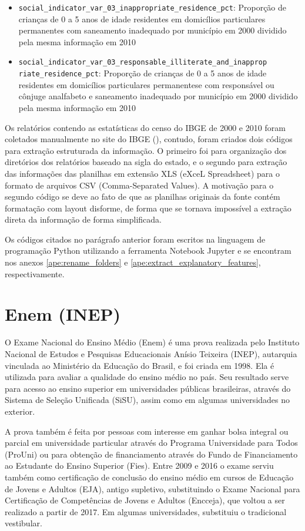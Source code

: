 \begin{itemize}
	\item \verb|social_indicator_var_03_inappropriate_residence_pct|: Proporção de crianças de 0 a 5 anos de idade residentes em domicílios particulares permanentes com saneamento inadequado por município em 2000 dividido pela mesma informação em 2010
	\item \verb|social_indicator_var_03_responsable_illiterate_and_inapprop|\\ \verb|riate_residence_pct|: Proporção de crianças de 0 a 5 anos de idade residentes em domicílios particulares permanentese com responsável ou cônjuge analfabeto e saneamento inadequado por município em 2000 dividido pela mesma informação em 2010
\end{itemize}

Os relatórios contendo as estatísticas do censo do IBGE de 2000 e 2010 foram coletados manualmente no site do IBGE (\citet{IBGE}), contudo, foram criados dois códigos para extração estruturada da informação. O primeiro foi para organização dos diretórios dos relatórios baseado na sigla do estado, e o segundo para extração das informações das planilhas em extensão XLS (eXceL Spreadsheet) para o formato de arquivos CSV (Comma-Separated Values). A motivação para o segundo código se deve ao fato de que as planilhas originais da fonte contém formatação com layout disforme, de forma que se tornava impossível a extração direta da informação de forma simplificada.

Os códigos citados no parágrafo anterior foram escritos na linguagem de programação Python utilizando a ferramenta Notebook Jupyter e se encontram nos anexos \ref{ape:rename_folders} e \ref{ape:extract_explanatory_features}, respectivamente.

\section{Enem (INEP)}
\label{sec:enem_inep}

O Exame Nacional do Ensino Médio (Enem) é uma prova realizada pelo Instituto Nacional de Estudos e Pesquisas Educacionais Anísio Teixeira (INEP), autarquia vinculada ao Ministério da Educação do Brasil, e foi criada em 1998. Ela é utilizada para avaliar a qualidade do ensino médio no país. Seu resultado serve para acesso ao ensino superior em universidades públicas brasileiras, através do Sistema de Seleção Unificada (SiSU), assim como em algumas universidades no exterior.

A prova também é feita por pessoas com interesse em ganhar bolsa integral ou parcial em universidade particular através do Programa Universidade para Todos (ProUni) ou para obtenção de financiamento através do Fundo de Financiamento ao Estudante do Ensino Superior (Fies). Entre 2009 e 2016 o exame serviu também como certificação de conclusão do ensino médio em cursos de Educação de Jovens e Adultos (EJA), antigo supletivo, substituindo o Exame Nacional para Certificação de Competências de Jovens e Adultos (Encceja), que voltou a ser realizado a partir de 2017. Em algumas universidades, substituiu o tradicional vestibular.

